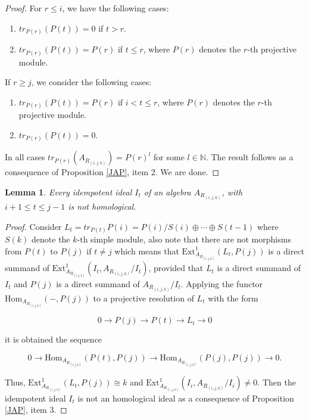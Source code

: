 \documentclass[10pt,twoside]{article}
\newcounter{neq}
\newtheorem{lema}{Lemma}
\theoremstyle{definition}
\begin{document}
\begin{proof}
For $r\leq i$, we have the following cases:

\begin{enumerate}
\item $tr_{P(r)}(P(t))=0$  if  $t>r$.

\item $tr_{P(r)}(P(t))=P(r)$ if  $t \leq r$, where $P(r)$ denotes the $r$-th projective module.
\end{enumerate}

If $r\geq j$, we consider the following cases:

\begin{enumerate}
\item $tr_{P(r)}(P(t))=P(r)$ if $i<t\leq r$, where $P(r)$ denotes the $r$-th projective module.
\item $tr_{P(r)}(P(t))=0$.

\end{enumerate}


In all cases $tr_{P(r)}(A_{R_{(i, j, k)}})=P(r)^{l}$ for some $l\in \mathbb{N}$. The result follows as a consequence of Proposition \ref{JAP}, item 2. We are done.
\end{proof}


\begin{lema}\label{center}
Every idempotent ideal $I_t$  of an algebra $A_{R_{(i, j, k)}}$, with $i+1\leq t \leq j-1$ is not homological.
\end{lema}


\begin{proof}
Consider $L_t=tr_{P(t)}P(i)=P(i)/S(i)\oplus\cdots \oplus S(t-1) $ where $S(k)$ denote the $k$-th simple module, also note that there are not morphisms from  $P(t)$ to $P(j)$ if $t\neq j$ which means that $\textrm{Ext}^{1}_{A_{R_{(i, j, k)}}}(L_t,P(j))$ is a direct summand of $\textrm{Ext}^{1}_{A_{R_{(i, j, k)}}}(I_t,A_{R_{(i, j, k)}}/I_t)$, provided that $L_t$ is a direct summand of $I_t$ and $P(j)$ is a direct summand of $A_{R_{(i, j, k)}}/I_{t}$. Applying the functor $\textrm{Hom}_{A_{R_{(i, j, k)}}}(-,P(j))$ to a projective resolution of $L_t$ with the form

\[
0 \to P(j) \to P(t) \to L_t \to 0
\]

it is obtained the sequence

\[
0 \to \textrm{Hom}_{A_{R_{(i, j, k)}}}(P(t),P(j)) \to  \textrm{Hom}_{A_{R_{(i, j, k)}}}(P(j),P(j)) \to 0.
\]

Thus, $\textrm{Ext}^{1}_{A_{R_{(i, j, k)}}}(L_t,P(j)) \cong k$ and $\textrm{Ext}^{1}_{A_{R_{(i, j, k)}}}(I_{i},A_{R_{(i, j, k)}}/I_i) \not= 0$. Then the idempotent ideal $I_t$ is not an homological ideal
as a consequence of Proposition \ref{JAP}, item 3.
\end{proof}
\end{document}
